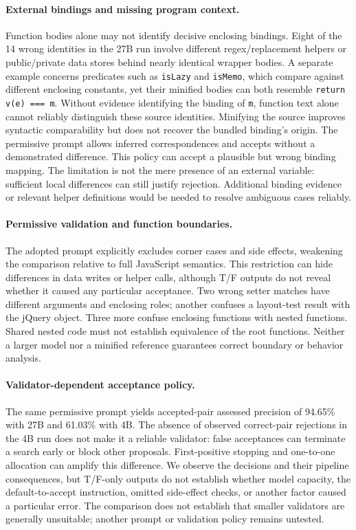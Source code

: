 \paragraph{External bindings and missing program context.}
Function bodies alone may not identify decisive enclosing bindings. Eight of the 14 wrong identities in the 27B run involve different regex/replacement helpers or public/private data stores behind nearly identical wrapper bodies. A separate example concerns predicates such as \texttt{isLazy} and \texttt{isMemo}, which compare against different enclosing constants, yet their minified bodies can both resemble \texttt{return v(e) === m}. Without evidence identifying the binding of \texttt{m}, function text alone cannot reliably distinguish these source identities. Minifying the source improves syntactic comparability but does not recover the bundled binding's origin. The permissive prompt allows inferred correspondences and accepts without a demonstrated difference. This policy can accept a plausible but wrong binding mapping. The limitation is not the mere presence of an external variable: sufficient local differences can still justify rejection. Additional binding evidence or relevant helper definitions would be needed to resolve ambiguous cases reliably.

\paragraph{Permissive validation and function boundaries.}
The adopted prompt explicitly excludes corner cases and side effects, weakening the comparison relative to full JavaScript semantics. This restriction can hide differences in data writes or helper calls, although T/F outputs do not reveal whether it caused any particular acceptance. Two wrong setter matches have different arguments and enclosing roles; another confuses a layout-test result with the jQuery object. Three more confuse enclosing functions with nested functions. Shared nested code must not establish equivalence of the root functions. Neither a larger model nor a minified reference guarantees correct boundary or behavior analysis.

\paragraph{Validator-dependent acceptance policy.}
The same permissive prompt yields accepted-pair assessed precision of 94.65\% with 27B and 61.03\% with 4B. The absence of observed correct-pair rejections in the 4B run does not make it a reliable validator: false acceptances can terminate a search early or block other proposals. First-positive stopping and one-to-one allocation can amplify this difference. We observe the decisions and their pipeline consequences, but T/F-only outputs do not establish whether model capacity, the default-to-accept instruction, omitted side-effect checks, or another factor caused a particular error. The comparison does not establish that smaller validators are generally unsuitable; another prompt or validation policy remains untested.


